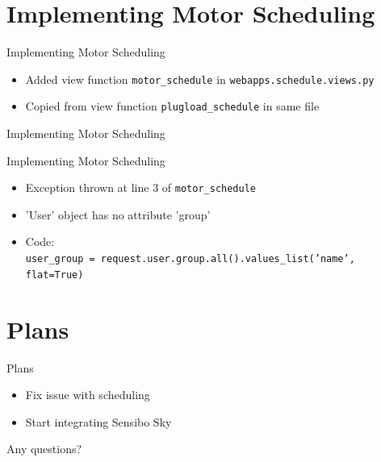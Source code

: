 \documentclass{beamer}
\begin{document}
\section{Implementing Motor Scheduling}
\begin{frame}{Implementing Motor Scheduling}
\begin{itemize}
\item Added view function \texttt{motor\_schedule} in \texttt{webapps.schedule.views.py} 
\item Copied from view function \texttt{plugload\_schedule} in same file
\end{itemize}
\end{frame}

\begin{frame}{Implementing Motor Scheduling}
\end{frame}

\begin{frame}{Implementing Motor Scheduling}
\begin{itemize}
\item Exception thrown at line 3 of \texttt{motor\_schedule}
\item 'User' object has no attribute 'group'
\item Code: \\\texttt{user\_group = request.user.group.all().values\_list('name', flat=True)}
\end{itemize}
\end{frame}

\section{Plans}
\begin{frame}{Plans}
\begin{itemize}
\item Fix issue with scheduling
\item Start integrating Sensibo Sky
\end{itemize}
\end{frame}

\begin{frame}
\centering
\Huge
Any questions?
\end{frame}
\end{document}

